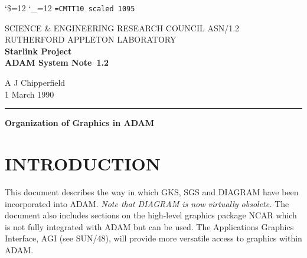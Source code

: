 \pagestyle{myheadings}

\newcommand{\stardoccategory}  {ADAM System Note}
\newcommand{\stardocinitials}  {ASN}
\newcommand{\stardocnumber}    {1.2}
\newcommand{\stardocauthors}   {A J Chipperfield}
\newcommand{\stardocdate}      {1 March 1990}
\newcommand{\stardoctitle}     {Organization of Graphics in ADAM}

\newcommand{\stardocname}{\stardocinitials /\stardocnumber}
\markright{\stardocname}
\setlength{\textwidth}{160mm}
\setlength{\textheight}{240mm}
\setlength{\topmargin}{-5mm}
\setlength{\oddsidemargin}{0mm}
\setlength{\evensidemargin}{0mm}
\setlength{\parindent}{0mm}
\setlength{\parskip}{\medskipamount}
\setlength{\unitlength}{1mm}

\catcode`\$=12 \catcode`\_=12
\font\tt=CMTT10 scaled 1095
\renewcommand{\_}{{\tt\char'137}}


\thispagestyle{empty}
SCIENCE \& ENGINEERING RESEARCH COUNCIL \hfill \stardocname\\
RUTHERFORD APPLETON LABORATORY\\
{\large\bf Starlink Project\\}
{\large\bf \stardoccategory\ \stardocnumber}
\begin{flushright}
\stardocauthors\\
\stardocdate
\end{flushright}
\vspace{-4mm}
\rule{\textwidth}{0.5mm}
\vspace{5mm}
\begin{center}
{\Large\bf \stardoctitle}
\end{center}
\vspace{5mm}

\section{INTRODUCTION}
This document describes the way in which GKS, SGS and DIAGRAM have
been incorporated into ADAM.
{\em Note that DIAGRAM is now virtually obsolete.}
The document also includes sections on
the high-level graphics package NCAR which is not fully integrated
with ADAM but can be used.
The Applications Graphics Interface, AGI (see SUN/48), will provide
more versatile access to graphics within ADAM.

